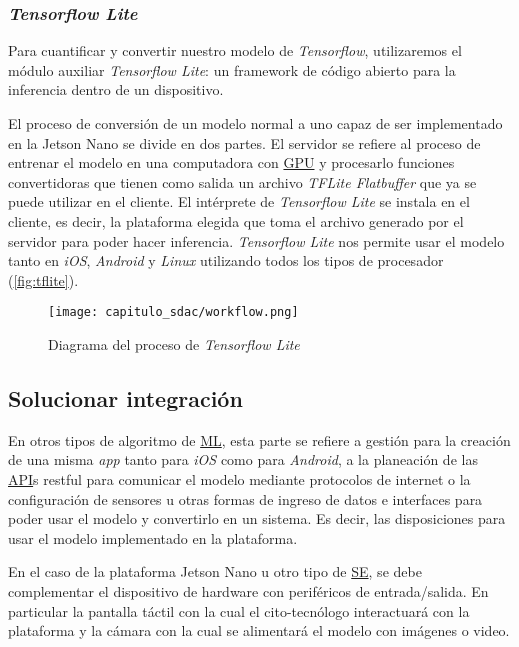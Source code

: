 \subsubsection{\emph{Tensorflow Lite}}

Para cuantificar y convertir nuestro modelo de \emph{Tensorflow}, utilizaremos
el módulo auxiliar \emph{Tensorflow Lite}: un framework de código abierto para
la inferencia dentro de un dispositivo.

El proceso de conversión de un modelo normal a uno capaz de ser implementado en
la Jetson Nano se divide en dos partes. El servidor se refiere al proceso de
entrenar el modelo en una computadora con \hyperlink{abbr}{GPU} y procesarlo
funciones convertidoras que tienen como salida un archivo \emph{TFLite
Flatbuffer} que ya se puede utilizar en el cliente. El intérprete de
\emph{Tensorflow Lite} se instala en el cliente, es decir, la plataforma elegida
que toma el archivo generado por el servidor para poder hacer inferencia.
\emph{Tensorflow Lite} nos permite usar el modelo tanto en \emph{iOS},
\emph{Android} y \emph{Linux} utilizando todos los tipos de procesador
(\autoref{fig:tflite}).

\begin{figure}[H]
    \centering
    \texttt{[image: capitulo\_sdac/workflow.png]}
    \caption{Diagrama del proceso de \emph{Tensorflow Lite}}\label{fig:tflite}
\end{figure}

\subsection{Solucionar integración}

En otros tipos de algoritmo de \hyperlink{abbr}{ML}, esta parte se refiere a
gestión para la creación de una misma \emph{app} tanto para \emph{iOS} como para
\emph{Android}, a la planeación de las \hyperlink{abbr}{API}s restful para
comunicar el modelo mediante protocolos de internet o la configuración de
sensores u otras formas de ingreso de datos e interfaces para poder usar el
modelo y convertirlo en un sistema. Es decir, las disposiciones para usar el
modelo implementado en la plataforma.

En el caso de la plataforma Jetson Nano u otro tipo de \hyperlink{abbr}{SE}, se
debe complementar el dispositivo de hardware con periféricos de entrada/salida.
En particular la pantalla táctil con la cual el cito-tecnólogo interactuará con
la plataforma y la cámara con la cual se alimentará el modelo con imágenes o
video.


